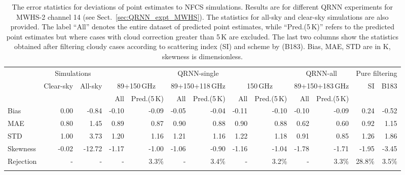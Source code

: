 \documentclass[amt, manuscript]{copernicus}
\begin{document}
\begin{table}[t]
	\caption{The error statistics for deviations of point estimates to NFCS simulations. Results are for different QRNN experiments for MWHS-2 channel 14 (see Sect.~\ref{sec:QRNN_expt_MWHS}). The statistics for all-sky and clear-sky simulations are also provided. The label ``All'' denotes the entire dataset of predicted point estimates, while ``Pred.(5\,K)'' refers to the predicted point estimates but where cases with cloud correction greater than 5\,K are excluded. The last two columns show the statistics obtained after filtering cloudy cases according to scattering index (SI) and scheme by \citet{buehler:aclou:07} (B183). Bias, MAE, STD are in K, skewness is dimensionless.}
	\label{tab:error_statistics_mwhs_14}
	\setlength{\tabcolsep}{4pt}
	\begin{tabular}{lrr|rr|rr|rr|rr|rr}
		\tophline
		&\multicolumn{2}{c|}{Simulations}& \multicolumn{6}{c|}{QRNN-single} & \multicolumn{2}{c|}{QRNN-all} & \multicolumn{2}{c}{Pure filtering}\\
		\cline{2-13}
		&   Clear-sky &   All-sky &  \multicolumn{2}{c|}{89+150\,GHz} & \multicolumn{2}{c|}{89+150+118\,GHz} & \multicolumn{2}{c|}{150\,GHz} & \multicolumn{2}{c|}{89+150+183\,GHz}& SI & B183\\		
		&			   &			& All & Pred.(5\,K) & All & Pred.(5\,K) & All & Pred.(5\,K)  & All & Pred.(5\,K)&&\\
		\middlehline
Bias     &  0.00 &  -0.84 & -0.10 & -0.09 & -0.05 & -0.04 & -0.11 & -0.10 & -0.10 & -0.09 & 0.24  & -0.52\\
MAE      &  0.80 &   1.45 &  0.89 &  0.87 &  0.90 &  0.88 &  0.90 &  0.88 &  0.62 &  0.60 & 0.92  & 1.15\\
STD      &  1.00 &   3.73 &  1.20 &  1.16 &  1.21 &  1.16 &  1.22 &  1.18 &  0.91 &  0.85 & 1.26  & 1.86\\
Skewness & -0.02 & -12.72 & -1.17 & -1.00 & -1.06 & -0.90 & -1.16 & -1.04 & -1.78 & -1.71 &-1.95  & -3.45\\
Rejection&  -	 & - 	  & - 	  & 3.3\% & - 	  & 3.4\% & -     & 3.2\% & -     & 3.3\% & 28.8\%& 3.5\%\\
\bottomhline
	\end{tabular}
\end{table}
\end{document}
